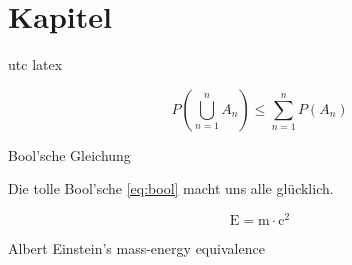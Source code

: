 





\frontmatter




\blankpage


\setcounter{page}{-1}
\thispagestyle{empty}



\clearpage




\clearpage




\clearpage






\mainmatter

\chapter{Kapitel}\label{chap:first}
\lipsum[]\parencite{biblatex}
\acrshort{utc}
\gls{latex}
\begin{mycapequ}[!ht]
    \begin{equation}
        {P(\bigcup_{n=1}^n A_n) \leq \sum_{n=1}^n P(A_n)}
        \label{eq:bool} %
    \end{equation}
    \caption{Bool'sche Gleichung}
\end{mycapequ}

\noindent Die tolle Bool'sche \cref{eq:bool} macht uns alle glücklich.

\begin{mycapequ}[!ht]
    \begin{equation}
        \mathrm{E=m\cdot c^2}
        \label{eq:meequi} %
    \end{equation}
    \caption{Albert Einstein's mass-energy equivalence}
\end{mycapequ}

